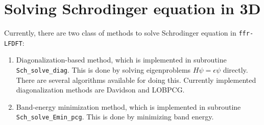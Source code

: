 \chapter{Solving Schrodinger equation in 3D}

Currently, there are two class of methods to solve Schrodinger equation in
\texttt{ffr-LFDFT}:
\begin{enumerate}
\item Diagonalization-based method, which is implemented in subroutine \texttt{Sch\_solve\_diag}.
This is done by solving eigenproblems $H\psi=\epsilon\psi$ directly.
There are several algorithms available for doing this. Currently implemented diagonalization
methods are Davidson and LOBPCG.
\item Band-energy minimization method, which is implemented in subroutine \texttt{Sch\_solve\_Emin\_pcg}.
This is done by minimizing band energy.
\texttt{}
\end{enumerate}
